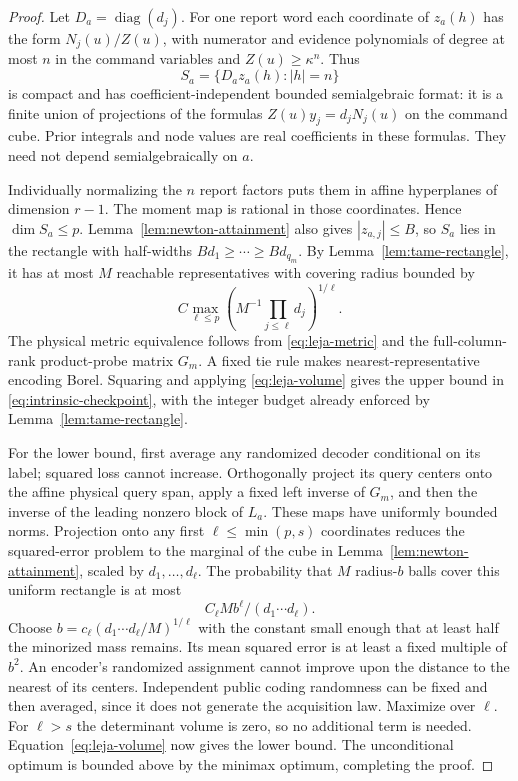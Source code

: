 \documentclass[11pt]{amsart}
\theoremstyle{definition}\newtheorem{definition}[theorem]{Definition}
\theoremstyle{remark}\newtheorem{remark}[theorem]{Remark}
\begin{document}
\begin{proof}
Let $D_a=\operatorname{diag}(d_j)$. For one report word each coordinate
of $z_a(h)$ has the form $N_j(u)/Z(u)$, with numerator and evidence
polynomials of degree at most $n$ in the command variables and
$Z(u)\ge\kappa^n$. Thus
\[
 S_a=\{D_az_a(h):|h|=n\}
\]
is compact and has coefficient-independent bounded semialgebraic format:
it is a finite union of projections of the formulas
$Z(u)y_j=d_jN_j(u)$ on the command cube. Prior integrals and node
values are real coefficients in these formulas. They need not depend
semialgebraically on $a$.

Individually normalizing the $n$ report factors puts them in affine
hyperplanes of dimension $r-1$. The moment map is rational in those
coordinates. Hence $\dim S_a\le p$. Lemma~\ref{lem:newton-attainment}
also gives $|z_{a,j}|\le B$, so $S_a$ lies in the rectangle with
half-widths $Bd_1\ge\cdots\ge Bd_{q_m}$. By
Lemma~\ref{lem:tame-rectangle}, it has at most $M$ reachable
representatives with covering radius bounded by
\[
 C\max_{\ell\le p}
       \left(M^{-1}\prod_{j\le\ell}d_j\right)^{1/\ell}.
\]
The physical metric equivalence follows from \eqref{eq:leja-metric}
and the full-column-rank product-probe matrix $G_m$. A fixed tie rule
makes nearest-representative encoding Borel. Squaring and applying
\eqref{eq:leja-volume} gives the upper bound in
\eqref{eq:intrinsic-checkpoint}, with the integer budget already enforced
by Lemma~\ref{lem:tame-rectangle}.

For the lower bound, first average any randomized decoder conditional on
its label; squared loss cannot increase. Orthogonally project its query
centers onto the affine physical query span, apply a fixed left inverse
of $G_m$, and then the inverse of the leading nonzero block of $L_a$.
These maps have uniformly bounded norms. Projection onto any first
$\ell\le\min(p,s)$ coordinates reduces the squared-error problem to
the marginal of the cube in Lemma~\ref{lem:newton-attainment}, scaled
by $d_1,\ldots,d_\ell$. The probability that $M$ radius-$b$ balls
cover this uniform rectangle is at most
\[
 C_\ell M b^\ell/(d_1\cdots d_\ell).
\]
Choose $b=c_\ell(d_1\cdots d_\ell/M)^{1/\ell}$ with the
constant small enough that at least half the minorized mass remains.
Its mean squared error is at least a fixed multiple of $b^2$.
An encoder's randomized assignment cannot improve upon the distance to
the nearest of its centers. Independent public coding randomness can be
fixed and then averaged, since it does not generate the acquisition law.
Maximize over $\ell$. For $\ell>s$ the determinant volume is zero,
so no additional term is needed. Equation~\eqref{eq:leja-volume}
now gives the lower bound. The unconditional optimum is bounded above
by the minimax optimum, completing the proof.
\end{proof}
\end{document}
